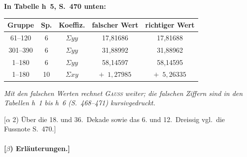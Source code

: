 \documentclass[12pt,a4paper]{article}
\theoremstyle{plain}
\theoremstyle{definition}
\theoremstyle{remark}
\begin{document}
\begin{small}
\textbf{In Tabelle h~5, S.~470 unten:}
\end{small}

\begin{footnotesize}
\begin{center}
\begin{tabular}{|c|c|c|c|c|}
\hline
Gruppe & Sp. & Koeffiz. & falscher Wert & richtiger Wert \\
\hline
61--120 & 6 & $\Sigma yy$ & 17,81686 & 17,81688 \\
301--390 & 6 & $\Sigma yy$ & 31,88992 & 31,88962 \\
1--180 & 6 & $\Sigma yy$ & 58,14597 & 58,14595 \\
1--180 & 10 & $\Sigma xy$ & $+\phantom{0}1,27985$ & $+\phantom{0}5,26335$ \\
\hline
\end{tabular}
\end{center}
\textit{Mit den falschen Werten rechnet \textsc{Gau\ss} weiter; die falschen Ziffern sind in
den Tabellen h~1 bis h~6 (S.~468--471) \textit{kursiv}gedruckt.}

[$\alpha$ 2) \"Uber die 18. und 36.~Dekade sowie das 6. und 12.~Dreissig
vgl.~die Fussnote S.~470.]
\end{footnotesize}

\paragraph*{[$\beta$) Erl\"auterungen.]}
\end{document}
